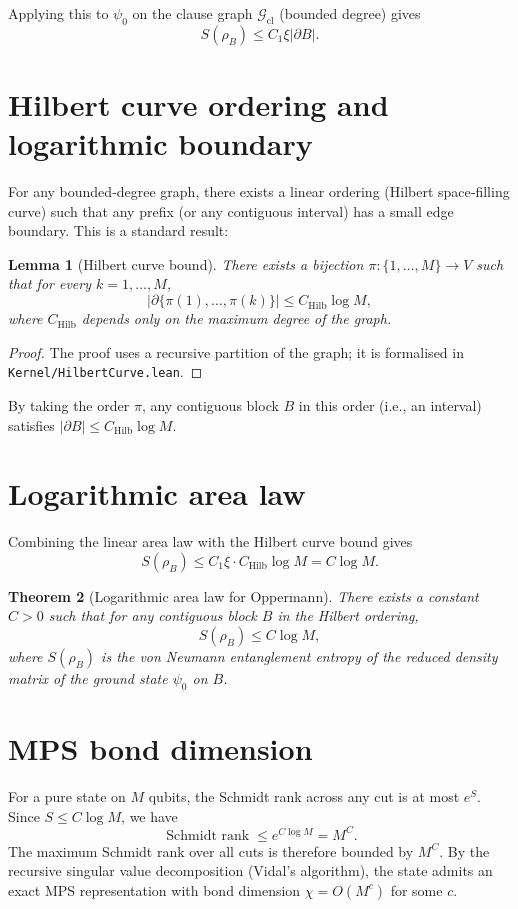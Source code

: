 \documentclass[11pt,a4paper]{article}
\newtheorem{theorem}{Theorem}[section]
\newtheorem{lemma}[theorem]{Lemma}
\begin{document}
Applying this to $\psi_0$ on the clause graph $\mathcal{G}_{\mathrm{cl}}$ (bounded degree) gives
\[
S(\rho_B) \le C_1 \xi |\partial B|.
\]

\section{Hilbert curve ordering and logarithmic boundary}

For any bounded‑degree graph, there exists a linear ordering (Hilbert space‑filling curve) such that any prefix (or any contiguous interval) has a small edge boundary. This is a standard result:

\begin{lemma}[Hilbert curve bound]\label{lem:hilbert}
There exists a bijection $\pi : \{1,\dots,M\} \to V$ such that for every $k=1,\dots,M$,
\[
|\partial\{\pi(1),\dots,\pi(k)\}| \le C_{\mathrm{Hilb}} \log M,
\]
where $C_{\mathrm{Hilb}}$ depends only on the maximum degree of the graph.
\end{lemma}
\begin{proof}
The proof uses a recursive partition of the graph; it is formalised in \texttt{Kernel/HilbertCurve.lean}.
\end{proof}

By taking the order $\pi$, any contiguous block $B$ in this order (i.e., an interval) satisfies $|\partial B| \le C_{\mathrm{Hilb}} \log M$.

\section{Logarithmic area law}

Combining the linear area law with the Hilbert curve bound gives
\[
S(\rho_B) \le C_1 \xi \cdot C_{\mathrm{Hilb}} \log M = C \log M.
\]

\begin{theorem}[Logarithmic area law for Oppermann]\label{thm:logarea}
There exists a constant $C>0$ such that for any contiguous block $B$ in the Hilbert ordering,
\[
S(\rho_B) \le C \log M,
\]
where $S(\rho_B)$ is the von Neumann entanglement entropy of the reduced density matrix of the ground state $\psi_0$ on $B$.
\end{theorem}

\section{MPS bond dimension}

For a pure state on $M$ qubits, the Schmidt rank across any cut is at most $e^{S}$. Since $S \le C\log M$, we have
\[
\operatorname{Schmidt\ rank} \le e^{C\log M} = M^{C}.
\]
The maximum Schmidt rank over all cuts is therefore bounded by $M^{C}$. By the recursive singular value decomposition (Vidal's algorithm), the state admits an exact MPS representation with bond dimension $\chi = O(M^{c})$ for some $c$.
\end{document}
